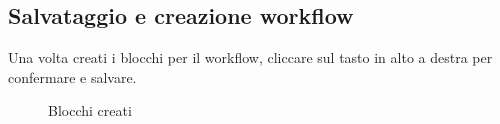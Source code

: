 \subsection{Salvataggio e creazione workflow}
Una volta creati i blocchi per il workflow, cliccare sul tasto in alto a destra per confermare e salvare.
\begin{figure}[!ht]
	\centering
	\caption{Blocchi creati}
\end{figure}
